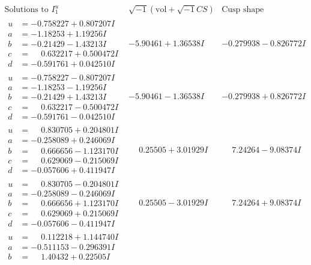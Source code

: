 \documentclass[1p]{elsarticle_modified}
\theoremstyle{definition}
\newcommand{\I}{\sqrt{-1}}
\begin{document}
$$\begin{array}{c|c|c}  
\text{Solutions to }I^u_{1}& \I (\text{vol} + \sqrt{-1}CS) & \text{Cusp shape}\\
 \hline 
\begin{aligned}
u &= -0.758227 + 0.807207 I \\
a &= -1.18253 + 1.19256 I \\
b &= -0.21429 - 1.43213 I \\
c &= \phantom{-}0.632217 + 0.500472 I \\
d &= -0.591761 + 0.042510 I\end{aligned}
 & -5.90461 + 1.36538 I & -0.279938 - 0.826772 I \\ \hline\begin{aligned}
u &= -0.758227 - 0.807207 I \\
a &= -1.18253 - 1.19256 I \\
b &= -0.21429 + 1.43213 I \\
c &= \phantom{-}0.632217 - 0.500472 I \\
d &= -0.591761 - 0.042510 I\end{aligned}
 & -5.90461 - 1.36538 I & -0.279938 + 0.826772 I \\ \hline\begin{aligned}
u &= \phantom{-}0.830705 + 0.204801 I \\
a &= -0.258089 + 0.246069 I \\
b &= \phantom{-}0.666656 - 1.123170 I \\
c &= \phantom{-}0.629069 - 0.215069 I \\
d &= -0.057606 + 0.411947 I\end{aligned}
 & \phantom{-}0.25505 + 3.01929 I & \phantom{-}7.24264 - 9.08374 I \\ \hline\begin{aligned}
u &= \phantom{-}0.830705 - 0.204801 I \\
a &= -0.258089 - 0.246069 I \\
b &= \phantom{-}0.666656 + 1.123170 I \\
c &= \phantom{-}0.629069 + 0.215069 I \\
d &= -0.057606 - 0.411947 I\end{aligned}
 & \phantom{-}0.25505 - 3.01929 I & \phantom{-}7.24264 + 9.08374 I \\ \hline\begin{aligned}
u &= \phantom{-}0.112218 + 1.144740 I \\
a &= -0.511153 - 0.296391 I \\
b &= \phantom{-}1.40432 + 0.22505 I \\

\end{aligned}
\end{array}$$
\end{document}
